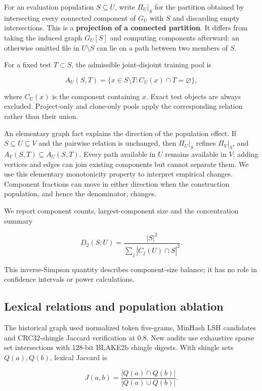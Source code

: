 \documentclass[preprint,12pt]{elsarticle}
\begin{document}
For an evaluation population \(S\subseteq U\), write \(\Pi_U|_S\) for the partition obtained by intersecting every connected component of \(G_U\) with \(S\) and discarding empty intersections. This is a \textbf{projection of a connected partition}. It differs from taking the induced graph \(G_U[S]\) and computing components afterward: an otherwise omitted file in \(U\setminus S\) can lie on a path between two members of \(S\).

For a fixed test \(T\subset S\), the admissible joint-disjoint training pool is

\[
A_U(S,T)=\{x\in S\setminus T: C_U(x)\cap T=\varnothing\},
\]

where \(C_U(x)\) is the component containing \(x\). Exact test objects are always excluded. Project-only and clone-only pools apply the corresponding relation rather than their union.

An elementary graph fact explains the direction of the population effect. If \(S\subseteq U\subseteq V\) and the pairwise relation is unchanged, then \(\Pi_U|_S\) refines \(\Pi_V|_S\), and \(A_V(S,T)\subseteq A_U(S,T)\). Every path available in \(U\) remains available in \(V\); adding vertices and edges can join existing components but cannot separate them. We use this elementary monotonicity property to interpret empirical changes. Component fractions can move in either direction when the construction population, and hence the denominator, changes.

We report component counts, largest-component size and the concentration summary

\[
D_2(S;U)=\frac{|S|^2}{\sum_j |C_j(U)\cap S|^2}.
\]

This inverse-Simpson quantity describes component-size balance; it has no role in confidence intervals or power calculations.

\subsection{Lexical relations and population ablation}\label{lexical-relations-and-population-ablation}

The historical graph used normalized token five-grams, MinHash LSH candidates and CRC32-shingle Jaccard verification at 0.8. New audits use exhaustive sparse set intersections with 128-bit BLAKE2b shingle digests. With shingle sets \(Q(a),Q(b)\), lexical Jaccard is

\[
J(a,b)=\frac{|Q(a)\cap Q(b)|}{|Q(a)\cup Q(b)|}.
\]
\end{document}
